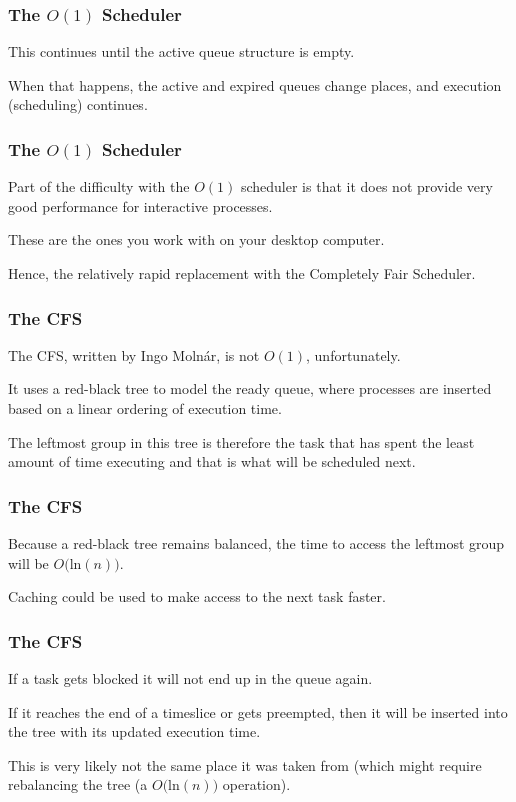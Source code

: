 \begin{frame}
\frametitle{The $O(1)$ Scheduler}

This continues until the active queue structure is empty. 

When that happens, the active and expired queues change places, and execution (scheduling) continues.


\end{frame}

\begin{frame}
\frametitle{The $O(1)$ Scheduler}

Part of the difficulty with the $O(1)$ scheduler is that it does not provide very good performance for interactive processes.

These are the ones you work with on your desktop computer. 

Hence, the relatively rapid replacement with the Completely Fair Scheduler.

\end{frame}

\begin{frame}
\frametitle{The CFS}

The CFS, written by Ingo Moln\'ar, is not $O(1)$, unfortunately. 

It uses a red-black tree to model the ready queue, where processes are inserted based on a linear ordering of execution time. 

The leftmost group in this tree is therefore the task that has spent the least amount of time executing and that is what will be scheduled next. 

\end{frame}

\begin{frame}
\frametitle{The CFS}

Because a red-black tree remains balanced, the time to access the leftmost group will be $O($ln$(n))$.

Caching could be used to make access to the next task faster.


\end{frame}

\begin{frame}
\frametitle{The CFS}

If a task gets blocked it will not end up in the queue again. 

If it reaches the end of a timeslice or gets preempted, then it will be inserted into the tree with its updated execution time.

This is very likely not the same place it was taken from (which might require rebalancing the tree (a $O($ln$(n))$ operation).


\end{frame}

